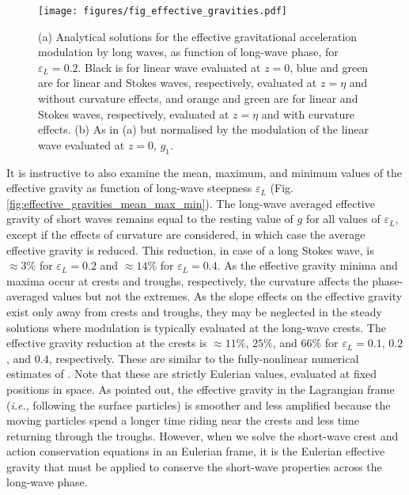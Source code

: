 \documentclass[lineno]{jfm}
\begin{document}
\begin{figure}
\centering
\texttt{[image: figures/fig\_effective\_gravities.pdf]}
\caption{
  (a) Analytical solutions for the effective gravitational acceleration
  modulation by long waves, as function of long-wave phase, for $\varepsilon_L = 0.2$.
  Black is for linear wave evaluated at $z=0$,
  blue and green are for linear and Stokes waves, respectively, evaluated at $z=\eta$ and without curvature effects,
  and orange and green are for linear and Stokes waves, respectively, evaluated at $z=\eta$ and with curvature effects.
  (b) As in (a) but normalised by the modulation of the linear wave evaluated at $z=0$, $g_1$.
}
\label{fig:effective_gravities}
\end{figure}

It is instructive to also examine the mean, maximum, and minimum values of the
effective gravity as function of long-wave steepness $\varepsilon_L$
(Fig. \ref{fig:effective_gravities_mean_max_min}).
The long-wave averaged effective gravity of short waves remains equal to the
resting value of $g$ for all values of $\varepsilon_L$, except if the effects
of curvature are considered, in which case the average effective gravity is
reduced.
This reduction, in case of a long Stokes wave, is $\approx 3\%$ for
$\varepsilon_L = 0.2$ and $\approx 14\%$ for $\varepsilon_L = 0.4$.
As the effective gravity minima and maxima occur at crests and troughs,
respectively, the curvature affects the phase-averaged values but not the extremes.
As the slope effects on the effective gravity exist only away from crests and
troughs, they may be neglected in the steady solutions where modulation is
typically evaluated at the long-wave crests. 
The effective gravity reduction at the crests is $\approx 11\%$, $25\%$, and $66\%$
for $\varepsilon_L = 0.1$, $0.2$, and $0.4$, respectively.
These are similar to the fully-nonlinear numerical estimates of
\citet{longuet1986eulerian,longuet1987propagation}.
Note that these are strictly Eulerian values, evaluated at fixed positions in
space.
As \citet{longuet1986eulerian} pointed out, the effective gravity in the
Lagrangian frame (\textit{i.e.}, following the surface particles) is smoother
and less amplified because the moving particles spend a longer time riding near
the crests and less time returning through the troughs.
However, when we solve the short-wave crest and action conservation equations
in an Eulerian frame, it is the Eulerian effective gravity that must be applied
to conserve the short-wave properties across the long-wave phase.
\end{document}
